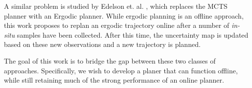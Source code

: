 A similar problem is studied by Edelson et. al. \cite{Edelson2020ErgodicGathering}, which replaces the MCTS planner with an Ergodic planner. While ergodic planning is an offline approach, this work proposes to replan an ergodic trajectory online after a number of \textit{in-situ} samples have been collected. After this time, the uncertainty map is updated based on these new observations and a new trajectory is planned. 

The goal of this work is to bridge the gap between these two classes of approaches. Specifically, we wish to develop a planer that can function offline, while still retaining much of the strong performance of an online planner.





%

